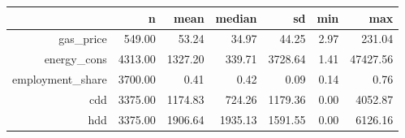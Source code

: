 \begin{tabular}{rrrrrrr}
  \hline
 & n & mean & median & sd & min & max \\ 
  \hline
gas\_price & 549.00 & 53.24 & 34.97 & 44.25 & 2.97 & 231.04 \\ 
  energy\_cons & 4313.00 & 1327.20 & 339.71 & 3728.64 & 1.41 & 47427.56 \\ 
  employment\_share & 3700.00 & 0.41 & 0.42 & 0.09 & 0.14 & 0.76 \\ 
  cdd & 3375.00 & 1174.83 & 724.26 & 1179.36 & 0.00 & 4052.87 \\ 
  hdd & 3375.00 & 1906.64 & 1935.13 & 1591.55 & 0.00 & 6126.16 \\ 
   \hline
\end{tabular}
